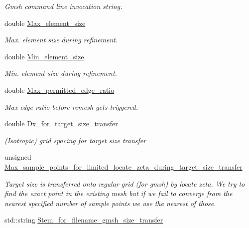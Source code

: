 \begin{DoxyCompactItemize}
\begin{DoxyCompactList}\small\item\em Gmsh command line invocation string. \end{DoxyCompactList}\item 
double \hyperlink{classoomph_1_1GmshParameters_a65bd88591891ff4284fb4e03d6f49c14}{Max\+\_\+element\+\_\+size}
\begin{DoxyCompactList}\small\item\em Max. element size during refinement. \end{DoxyCompactList}\item 
double \hyperlink{classoomph_1_1GmshParameters_a8efec35bdf92a73cf71f25cff41520b7}{Min\+\_\+element\+\_\+size}
\begin{DoxyCompactList}\small\item\em Min. element size during refinement. \end{DoxyCompactList}\item 
double \hyperlink{classoomph_1_1GmshParameters_ac62bbb70b5a1bd650f7b0b7c8fbe1d8f}{Max\+\_\+permitted\+\_\+edge\+\_\+ratio}
\begin{DoxyCompactList}\small\item\em Max edge ratio before remesh gets triggered. \end{DoxyCompactList}\item 
double \hyperlink{classoomph_1_1GmshParameters_a0c4d7e327d44f9514eb0ac0894f6f9d9}{Dx\+\_\+for\+\_\+target\+\_\+size\+\_\+transfer}
\begin{DoxyCompactList}\small\item\em (Isotropic) grid spacing for target size transfer \end{DoxyCompactList}\item 
unsigned \hyperlink{classoomph_1_1GmshParameters_a7a75351daca7e20f9dcb95919691d863}{Max\+\_\+sample\+\_\+points\+\_\+for\+\_\+limited\+\_\+locate\+\_\+zeta\+\_\+during\+\_\+target\+\_\+size\+\_\+transfer}
\begin{DoxyCompactList}\small\item\em Target size is transferred onto regular grid (for gmsh) by locate zeta. We try to find the exact point in the existing mesh but if we fail to converge from the nearest specified number of sample points we use the nearest of those. \end{DoxyCompactList}\item 
std\+::string \hyperlink{classoomph_1_1GmshParameters_ad0151a908bc36fee2d955551b1da4016}{Stem\+\_\+for\+\_\+filename\+\_\+gmsh\+\_\+size\+\_\+transfer}

\end{DoxyCompactItemize}
